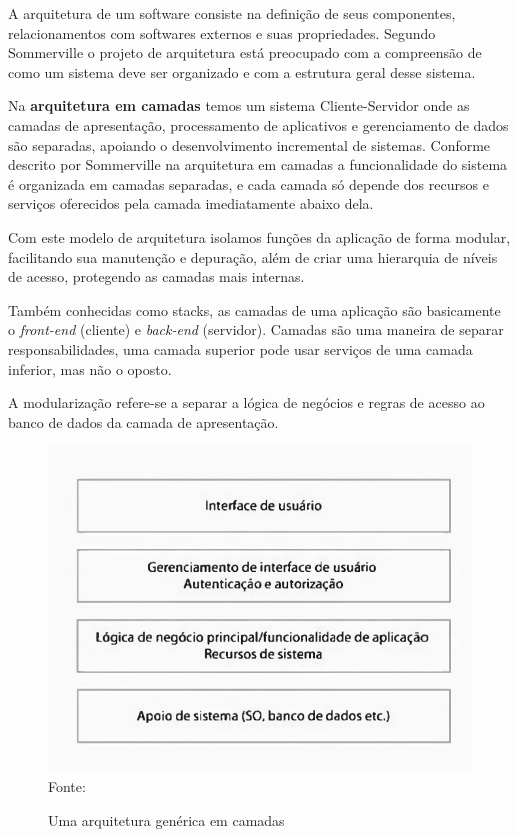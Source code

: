\documentclass[
	12pt,				%
	openright,			%
	twoside,			%
	a4paper,			%
	english,			%
	brazil				%
	]{abntex2}
\begin{document}

A arquitetura de um software consiste na definição de seus componentes, relacionamentos com softwares externos e suas propriedades. Segundo Sommerville\cite{sommerville_engenharia} o projeto de arquitetura está preocupado com a compreensão de como um sistema deve ser organizado e com a estrutura geral desse sistema.

Na \textbf{arquitetura em camadas} temos um sistema Cliente-Servidor onde as camadas de apresentação, processamento de aplicativos e gerenciamento de dados são separadas, apoiando o desenvolvimento incremental de sistemas. Conforme descrito por Sommerville\cite{sommerville_engenharia} na arquitetura em camadas a funcionalidade do sistema é organizada em camadas separadas, e cada camada só depende dos recursos e serviços oferecidos pela camada imediatamente abaixo dela.

Com este modelo de arquitetura isolamos funções da aplicação de forma modular, facilitando sua manutenção e depuração, além de criar uma hierarquia de níveis de acesso, protegendo as camadas mais internas.

Também conhecidas como stacks, as camadas de uma aplicação são basicamente o \textit{front-end} (cliente) e \textit{back-end} (servidor). Camadas são uma maneira de separar responsabilidades, uma camada superior pode usar serviços de uma camada inferior, mas não o oposto. 

A modularização refere-se a separar a lógica de negócios e regras de acesso ao banco de dados da camada de apresentação.

\begin{figure}[h]
	\centering

	\caption{Uma arquitetura genérica em camadas} \label{fig:MultilayerArchitecture}
    \includegraphics[scale=0.4]{multilayer-architecture} \\
    Fonte: {\cite{sommerville_engenharia}} %

\end{figure}
\end{document}
